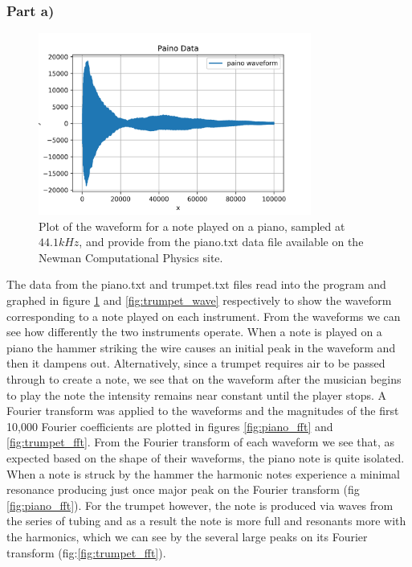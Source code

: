 \documentclass{article}
\begin{document}
\subsubsection{Part a)}

\begin{figure}[H]
	\centering
	\includegraphics[width=0.8\textwidth]{../images/piano_wave.png}
	\caption{Plot of the waveform for a note played on a piano, sampled at $44.1kHz$, and provide from the piano.txt data file available on the Newman Computational Physics site.}
	\label{fig:piano_wave}
\end{figure}

The data from the piano.txt and trumpet.txt files read into the program and graphed in figure \ref{fig:piano_wave} and \ref{fig:trumpet_wave} respectively to show the waveform corresponding to a note played on each instrument.
From the waveforms we can see how differently the two instruments operate. When a note is played on a piano the hammer striking the wire causes an initial peak in the waveform and then it dampens out. Alternatively, since a trumpet requires air to be passed through to create a note, we see that on the waveform after the musician begins to play the note the intensity remains near constant until the player stops. 
A Fourier transform was applied to the waveforms and the magnitudes of the first 10,000 Fourier coefficients are plotted in figures \ref{fig:piano_fft} and \ref{fig:trumpet_fft}. From the Fourier transform of each waveform we see that, as expected based on the shape of their waveforms, the piano note is quite isolated. When a note is struck by the hammer the harmonic notes experience a minimal resonance producing just once major peak on the Fourier transform (fig \ref{fig:piano_fft}). For the trumpet however, the note is produced via waves from the series of tubing and as a result the note is more full and resonants more with the harmonics, which we can see by the several large peaks on its Fourier transform (fig:\ref{fig:trumpet_fft}).  
\end{document}
